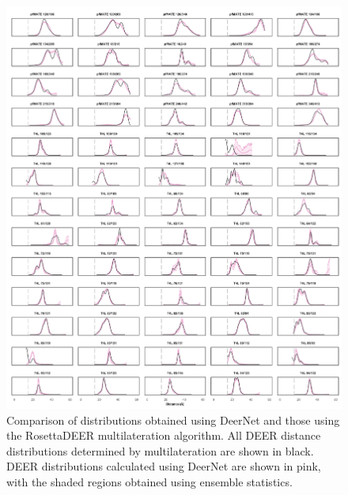 \begin{figure}[h]
\centering
\includegraphics[width=6in]{Figures/multilateration_supp_deernet.pdf}
\caption[Comparison of distributions obtained using DeerNet and those using the RosettaDEER multilateration algorithm.]{Comparison of distributions obtained using DeerNet and those using the RosettaDEER multilateration algorithm. All DEER distance distributions determined by multilateration are shown in black. DEER distributions calculated using DeerNet are shown in pink, with the shaded regions obtained using ensemble statistics.}
\label{fig:multilateration_supp_deernet}
\end{figure}

